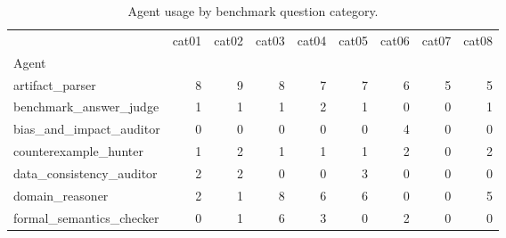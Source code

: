 \begin{table}
\caption{Agent usage by benchmark question category.}
\label{tab:agent-usage-by-category}
\begin{tabular}{lrrrrrrrr}
\toprule
 & cat01 & cat02 & cat03 & cat04 & cat05 & cat06 & cat07 & cat08 \\
Agent &  &  &  &  &  &  &  &  \\
\midrule
artifact\_parser & 8 & 9 & 8 & 7 & 7 & 6 & 5 & 5 \\
benchmark\_answer\_judge & 1 & 1 & 1 & 2 & 1 & 0 & 0 & 1 \\
bias\_and\_impact\_auditor & 0 & 0 & 0 & 0 & 0 & 4 & 0 & 0 \\
counterexample\_hunter & 1 & 2 & 1 & 1 & 1 & 2 & 0 & 2 \\
data\_consistency\_auditor & 2 & 2 & 0 & 0 & 3 & 0 & 0 & 0 \\
domain\_reasoner & 2 & 1 & 8 & 6 & 6 & 0 & 0 & 5 \\
formal\_semantics\_checker & 0 & 1 & 6 & 3 & 0 & 2 & 0 & 0 \\
\bottomrule
\end{tabular}
\end{table}

